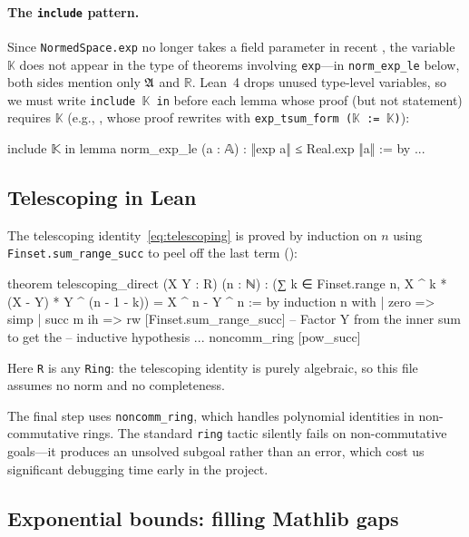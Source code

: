 \paragraph{The \texttt{include} pattern.}
Since \texttt{NormedSpace.exp} no longer takes a field parameter in recent
\Mathlib, the variable $\mathbb{K}$ does not appear in the type of theorems
involving \texttt{exp}---in \texttt{norm\_exp\_le} below, both sides mention
only $\mathfrak{A}$ and $\mathbb{R}$. Lean~4 drops unused type-level variables, so we
must write \texttt{include $\mathbb{K}$ in} before each lemma whose proof (but
not statement) requires $\mathbb{K}$
(e.g., , whose proof rewrites with
\texttt{exp\_tsum\_form ($\mathbb{K}$ := $\mathbb{K}$)}):

\begin{leancode}
include 𝕂 in
lemma norm_exp_le (a : 𝔸) : ‖exp a‖ ≤ Real.exp ‖a‖ := by ...
\end{leancode}

\subsection{Telescoping in Lean}
\label{sec:lean-telescoping}

The telescoping identity~\eqref{eq:telescoping} is proved by induction on $n$
using \texttt{Finset.sum\_range\_succ} to peel off the last term
():

\begin{leancode}
theorem telescoping_direct (X Y : R) (n : ℕ) :
    (∑ k ∈ Finset.range n,
      X ^ k * (X - Y) * Y ^ (n - 1 - k)) =
      X ^ n - Y ^ n := by
  induction n with
  | zero => simp
  | succ m ih =>
    rw [Finset.sum_range_succ]
    -- Factor Y from the inner sum to get the
    -- inductive hypothesis
    ...
    noncomm_ring [pow_succ]
\end{leancode}

Here \texttt{R} is any \texttt{Ring}: the telescoping identity is purely
algebraic, so this file assumes no norm and no completeness.

The final step uses \texttt{noncomm\_ring}, which handles polynomial identities
in non-commutative rings. The standard \texttt{ring} tactic silently fails on
non-commutative goals---it produces an unsolved subgoal rather than an error,
which cost us significant debugging time early in the project.

\subsection{Exponential bounds: filling Mathlib gaps}
\label{sec:lean-exp-bounds}

